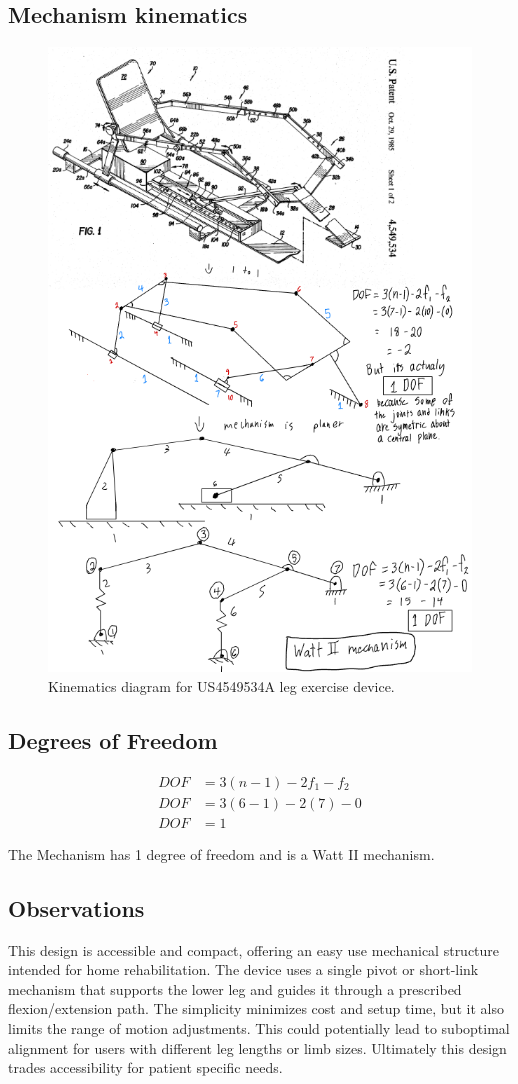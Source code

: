 \documentclass[11pt]{article}
\begin{document}
\subsection{Mechanism kinematics}
\begin{figure}[H]
  \centering
  \includegraphics[width=0.54\linewidth]{../Kinematic Mechanism Images/4549534.png}
  \caption{Kinematics diagram for US4549534A leg exercise device.}
  \label{fig:US4549534A_kinematics}
\end{figure}

\subsection{Degrees of Freedom}
\[
\begin{aligned}
DOF &= 3(n-1) - 2f_1 - f_2 \\
DOF &= 3(6-1) - 2(7) - 0 \\
DOF &= 1
\end{aligned}
\]

The Mechanism has 1 degree of freedom and is a Watt II mechanism.

\subsection{Observations}
This design is accessible and compact, offering an easy use mechanical structure intended for home rehabilitation. The device uses a single pivot or short-link mechanism that supports the lower leg and guides it through a prescribed flexion/extension path. The simplicity minimizes cost and setup time, but it also limits the range of motion adjustments. This could potentially lead to suboptimal alignment for users with different leg lengths or limb sizes. Ultimately this design trades accessibility for patient specific needs.
\end{document}
